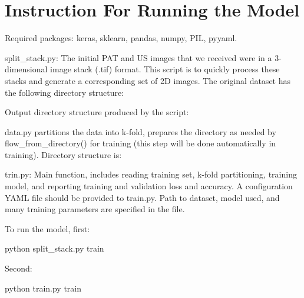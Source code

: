 \chapter{Instruction For Running the Model} %
\label{appendixA}

Required packages: keras, sklearn, pandas, numpy, PIL, pyyaml.

split\_stack.py: The initial PAT and US images that we received were in a 3-dimensional image stack (.tif) format. This script is to quickly process these stacks and generate a corresponding set of 2D images.
The original dataset has the following directory structure:

Output directory structure produced by the script:

data.py partitions the data into k-fold, prepares the directory as needed by flow\_from\_directory() for training (this step will be done automatically in training). Directory structure is:

trin.py: Main function, includes reading training set, k-fold partitioning, training model, and reporting training and validation loss and accuracy. A configuration YAML file should be provided to train.py. Path to dataset, model used, and many training parameters are specified in the file.

To run the model, first:

python split\_stack.py train

Second:

python train.py train
